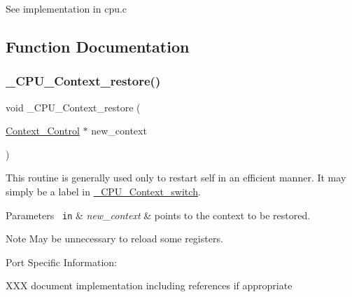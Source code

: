 See implementation in cpu.\+c 

\subsection{Function Documentation}
\mbox{\label{group__RTEMSScoreCPUBfinCPUContext_ga80726ebfe00f31a88b086cc4474c472f}} 
\subsubsection{\texorpdfstring{\_CPU\_Context\_restore()}{\_CPU\_Context\_restore()}}
{\footnotesize\ttfamily void \+\_\+\+C\+P\+U\+\_\+\+Context\+\_\+restore (\begin{DoxyParamCaption}\item[{\mbox{\hyperlink{structContext__Control}{Context\+\_\+\+Control}} $\ast$}]{new\+\_\+context }\end{DoxyParamCaption})}

This routine is generally used only to restart self in an efficient manner. It may simply be a label in \mbox{\hyperlink{group__RTEMSScoreCPUARM_gaa9f8cc989454b28232e5375e30c90970}{\+\_\+\+C\+P\+U\+\_\+\+Context\+\_\+switch}}.


\begin{DoxyParams}[1]{Parameters}
\mbox{\texttt{ in}}  & {\em new\+\_\+context} & points to the context to be restored.\\
\hline
\end{DoxyParams}
\begin{DoxyNote}{Note}
May be unnecessary to reload some registers.
\end{DoxyNote}
Port Specific Information\+:

X\+XX document implementation including references if appropriate \mbox{\label{group__RTEMSScoreCPUBfinCPUContext_gaa9f8cc989454b28232e5375e30c90970}} 
